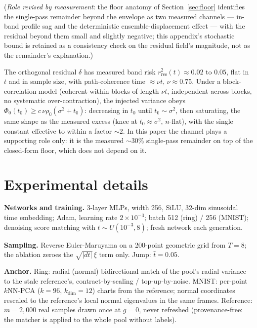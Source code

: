 \documentclass[11pt]{article}
\theoremstyle{remark}
\newcommand{\sigsq}{\sigma^2}
\begin{document}
(\emph{Role revised by measurement}: the floor anatomy of Section~\ref{sec:floor}
identifies the single-pass remainder beyond the envelope as two measured channels ---
in-band profile sag and the deterministic ensemble-displacement effect --- with the
residual beyond them small and slightly negative; this appendix's stochastic bound is
retained as a consistency check on the residual field's magnitude, not as the
remainder's explanation.)

The orthogonal residual $\delta$ has measured band risk
$r^2_{\mathrm{res}}(t)\approx0.02$ to $0.05$, flat in $t$ and in sample size, with
path-coherence time $\approx\nu t$, $\nu\approx0.75$. Under a block-correlation model
(coherent within blocks of length $\nu t$, independent across blocks, no systematic
over-contraction), the injected variance obeys
$\Phi_0(t_0)\ge c\,\nu\rho_0(\sigsq+t_0)$: decreasing in $t_0$ until $t_0\sim\sigsq$,
then saturating, the same shape as the measured excess (knee at $t_0\approx\sigsq$,
$n$-flat), with the single constant effective to within a factor $\sim2$. In this paper
the channel plays a supporting role only: it is the measured $\sim30\%$ single-pass
remainder on top of the closed-form floor, which does not depend on it.

\section{Experimental details}\label{app:details}

\textbf{Networks and training.} 3-layer MLPs, width 256, SiLU, 32-dim sinusoidal time
embedding; Adam, learning rate $2\times10^{-3}$; batch 512 (ring) / 256 (MNIST);
denoising score matching with $t\sim U(10^{-3},8)$; fresh network each generation.

\textbf{Sampling.} Reverse Euler-Maruyama on a 200-point geometric grid from $T=8$;
the ablation zeroes the $\sqrt{|dt|}\,\xi$ term only. Jump: $\hat t=0.05$.

\textbf{Anchor.} Ring: radial (normal) bidirectional match of the pool's radial
variance to the stale reference's, contract-by-scaling / top-up-by-noise. MNIST:
per-point $k$NN-PCA ($k=96$, $k_{\dim}=12$) charts from the reference; normal
coordinates rescaled to the reference's local normal eigenvalues in the same frames.
Reference: $m=2{,}000$ real samples drawn once at $g=0$, never refreshed
(provenance-free: the matcher is applied to the whole pool without labels).
\end{document}

